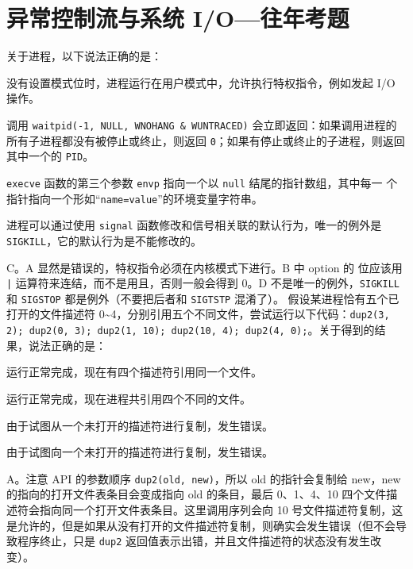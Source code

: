 \chapter{异常控制流与系统 I/O{---}往年考题}\thispagestyle{empty}
    \begin{problems}
         关于进程，以下说法正确的是：
        \begin{choices}
            \item 没有设置模式位时，进程运行在用户模式中，允许执行特权指令，例如发起 I/O 操作。
            \item 调用 \verb|waitpid(-1, NULL, WNOHANG & WUNTRACED)| 会立即返回：如果调用进程的所有子进程都没有被停止或终止，则返回 \verb|0|；如果有停止或终止的子进程，则返回其中一个的 \verb|PID|。
            \item \verb|execve| 函数的第三个参数 \verb|envp| 指向一个以 \verb|null| 结尾的指针数组，其中每一 个指针指向一个形如“\verb|name=value|”的环境变量字符串。
            \item 进程可以通过使用 \verb|signal| 函数修改和信号相关联的默认行为，唯一的例外是 \verb|SIGKILL|，它的默认行为是不能修改的。
        \end{choices}
        \sol C。A 显然是错误的，特权指令必须在内核模式下进行。B 中 option 的
        位应该用 \verb+|+ 运算符来连结，而不是用且，否则一般会得到 0。D 不是唯一的例外，\verb|SIGKILL| 和 \verb|SIGSTOP| 都是例外（不要把后者和 \verb|SIGTSTP| 混淆了）。
         假设某进程恰有五个已打开的文件描述符 0\textasciitilde4，分别引用五个不同文件，尝试运行以下代码：\verb|dup2(3, 2); dup2(0, 3); dup2(1, 10); dup2(10, 4); dup2(4, 0);|。关于得到的结果，说法正确的是：
        \begin{choices}
            \item 运行正常完成，现在有四个描述符引用同一个文件。
            \item 运行正常完成，现在进程共引用四个不同的文件。
            \item 由于试图从一个未打开的描述符进行复制，发生错误。
            \item 由于试图向一个未打开的描述符进行复制，发生错误。
        \end{choices}
        \sol A。注意 API 的参数顺序 \verb|dup2(old, new)|，所以 old 的指针会复制给 new，new的指向的打开文件表条目会变成指向 old 的条目，最后 0、1、4、10 四个文件描述符会指向同一个打开文件表条目。这里调用序列会向 10 号文件描述符复制，这是允许的，但是如果从没有打开的文件描述符复制，则确实会发生错误（但不会导致程序终止，只是 \verb|dup2| 返回值表示出错，并且文件描述符的状态没有发生改变）。

\end{problems}
